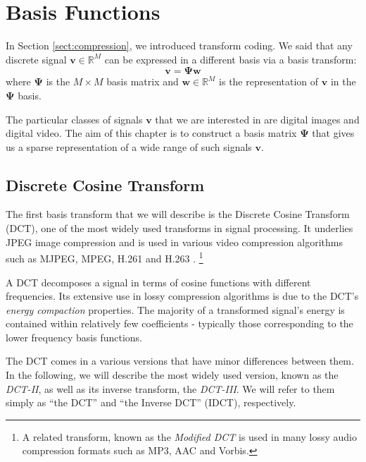 \chapter{Basis Functions}
\label{ch:dwt}
In Section \ref{sect:compression}, we introduced transform coding.
We said that any discrete signal $\bm v \in \mathbb{R}^M$ can be expressed in a different basis via a basis transform:
\begin{equation*}
  \bm v = \bm\Psi\bm w
\end{equation*}
where $\bm\Psi$ is the $M\times M$ basis matrix and $\bm w \in\mathbb{R}^M$ is the representation of $\bm v$ in the $\bm\Psi$ basis.

The particular classes of signals $\bm v$ that we are interested in are digital images and digital video.
The aim of this chapter is to construct a basis matrix $\bm\Psi$ that gives us a sparse representation of a wide range of such signals $\bm v$.

\section{Discrete Cosine Transform}
\label{sect:dct}
The first basis transform that we will describe is the Discrete Cosine Transform (DCT), one of the most widely used transforms in signal processing.
It underlies JPEG image compression and is used in various video compression algorithms such as MJPEG, MPEG, H.261 and H.263 \cite{zeng2013}.
\footnote{A related transform, known as the \emph{Modified DCT} is used in many lossy audio compression formats such as MP3, AAC and Vorbis.}

A DCT decomposes a signal in terms of cosine functions with different frequencies.
Its extensive use in lossy compression algorithms is due to the DCT's \emph{energy compaction} properties.
The majority of a transformed signal's energy is contained within relatively few coefficients - typically those corresponding to the lower frequency basis functions.

The DCT comes in a various versions that have minor differences between them.
In the following, we will describe the most widely used version, known as the \emph{DCT-II}, as well as its inverse transform, the \emph{DCT-III}.
We will refer to them simply as ``the DCT'' and ``the Inverse DCT'' (IDCT), respectively.

